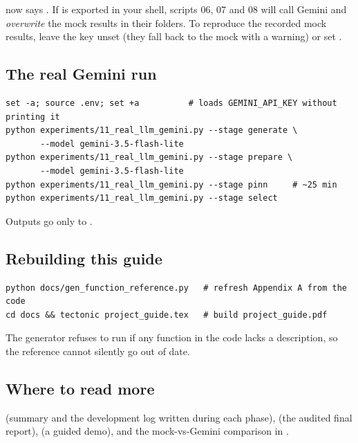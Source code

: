 \begin{caution}
 now says . If  is exported in your shell, scripts 06,
07 and 08 will call Gemini and \emph{overwrite} the mock results in their folders. To reproduce the recorded mock
results, leave the key unset (they fall back to the mock with a warning) or set .
\end{caution}

\subsection*{The real Gemini run}
\begin{verbatim}
set -a; source .env; set +a          # loads GEMINI_API_KEY without printing it
python experiments/11_real_llm_gemini.py --stage generate \
       --model gemini-3.5-flash-lite
python experiments/11_real_llm_gemini.py --stage prepare \
       --model gemini-3.5-flash-lite
python experiments/11_real_llm_gemini.py --stage pinn     # ~25 min
python experiments/11_real_llm_gemini.py --stage select
\end{verbatim}
Outputs go only to .

\subsection*{Rebuilding this guide}
\begin{verbatim}
python docs/gen_function_reference.py   # refresh Appendix A from the code
cd docs && tectonic project_guide.tex   # build project_guide.pdf
\end{verbatim}
The generator refuses to run if any function in the code lacks a description, so the reference cannot silently go
out of date.

\subsection*{Where to read more}
 (summary and the development log written during each phase),  (the audited final report),  (a guided demo), and the mock-vs-Gemini comparison in  .
